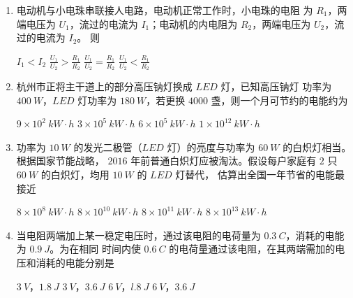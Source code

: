 
\begin{enumerate}
\item
{}
电动机与小电珠串联接人电路，电动机正常工作时，小电珠的电阻
为 $ R_{1} $，两端电压为 $ U_{1} $，流过的电流为 $ I_{1} $；电动机的内电阻为 $ R_{2} $，两端电压为 $ U_{2} $，流过的电流为 $ I_{2} $。
则  


\fourchoices
{$I_{1}<I_{2}$}
{$\frac{U_{1}}{U_{2}}>\frac{R_{1}}{R_{2}}$}
{$\frac{U_{1}}{U_{2}}=\frac{R_{1}}{R_{2}}$}
{$\frac{U_{1}}{U_{2}}<\frac{R_{1}}{R_{2}}$}


\item 
{}
杭州市正将主干道上的部分高压钠灯换成 $ LED $ 灯，已知高压钠灯
功率为 $ 400 \ W $，$ LED $ 灯功率为 $ 180 \ W $，若更换 $ 4000 $ 盏，则一个月可节约的电能约为  

\fourchoices
{$ 9 \times 10^{2} \ kW \cdot h $}
{$ 3 \times 10^{5} \ kW \cdot h $}
{$ 6 \times 10^{5} \ kW \cdot h $}
{$ 1 \times 10^{12} \ kW \cdot h $}



\item 
{}
功率为 $ 10 \ W $ 的发光二极管（$ LED $ 灯）的亮度与功率为 $ 60 \ W $ 的白炽灯相当。根据国家节能战略，
$ 2016 $ 年前普通白炽灯应被淘汰。假设每户家庭有 $ 2 $ 只 $ 60 \ W $ 的白炽灯，均用 $ 10 \ W $ 的 $ LED $ 灯替代，
估算出全国一年节省的电能最接近  

\fourchoices
{$ 8 \times 10^{8} \ kW \cdot h $}
{$ 8 \times 10 ^{10} \ kW \cdot h $}
{$ 8 \times 10 ^{11} \ kW \cdot h $}
{$ 8 \times 10 ^{13} \ kW \cdot h $}



\item 
{}
当电阻两端加上某一稳定电压时，通过该电阻的电荷量为 $ 0.3 \ C $，消耗的电能为 $ 0.9 \ J $。为在相同
时间内使 $ 0.6 \ C $ 的电荷量通过该电阻，在其两端需加的电压和消耗的电能分别是  

\fourchoices
{$ 3 \ V $，$ 1.8 \ J $}
{$ 3 \ V $，$ 3.6 \ J $}
{$ 6 \ V $，$ l.8 \ J $}
{$ 6 \ V $，$ 3.6 \ J $}




\end{enumerate}

